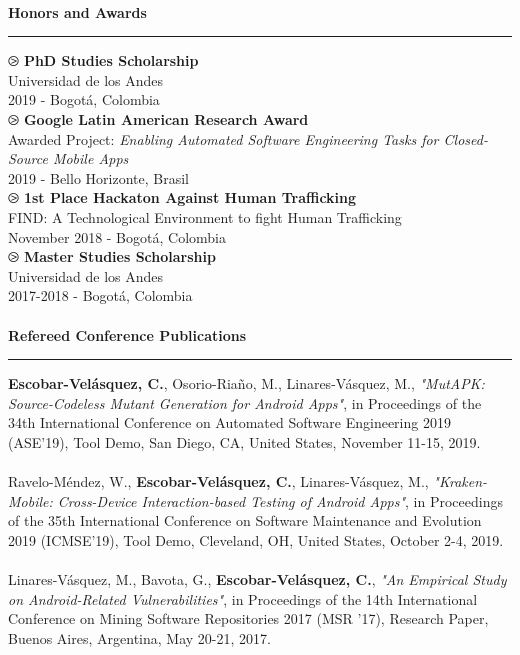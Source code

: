 \documentclass[letterpaper,11pt,oneside]{article}
\begin{document}
\\
\noindent \Large{\textbf{Honors and Awards}} \\
\vspace{-2ex}
\hrule 
\normalsize
\vspace{2ex}
\noindent $\ogreaterthan$ \textbf{PhD Studies Scholarship} \\
Universidad de los Andes\\
2019 - Bogotá, Colombia \\
\noindent $\ogreaterthan$ \textbf{Google Latin American Research Award} \\
Awarded Project: \textit{Enabling Automated Software Engineering Tasks for Closed-Source Mobile Apps}\\
2019 - Bello Horizonte, Brasil \\
\noindent $\ogreaterthan$ \textbf{1st Place Hackaton Against Human Trafficking} \\
FIND: A Technological Environment to fight Human Trafficking\\
November 2018 - Bogotá, Colombia \\
\noindent $\ogreaterthan$ \textbf{Master Studies Scholarship} \\
Universidad de los Andes\\
2017-2018 - Bogotá, Colombia \\
\\
\noindent \Large{\textbf{Refereed Conference Publications}} \\
\vspace{-2ex}
\hrule 
\normalsize
\vspace{2ex}
\noindent [c3] \textbf{Escobar-Velásquez, C.}, Osorio-Riaño, M., Linares-Vásquez, M., \textit{"MutAPK: Source-Codeless Mutant Generation for Android Apps"}, in Proceedings of the 34th International Conference on Automated Software Engineering 2019 (ASE’19), Tool Demo, San Diego, CA, United States, November 11-15, 2019. \\
\\
\noindent [c2] Ravelo-Méndez, W., \textbf{Escobar-Velásquez, C.}, Linares-Vásquez, M., \textit{"Kraken-Mobile: Cross-Device Interaction-based Testing of Android Apps"}, in Proceedings of the 35th International Conference on Software Maintenance and Evolution 2019 (ICMSE’19), Tool Demo, Cleveland, OH, United States, October 2-4, 2019. \\
\\
\noindent [c1] Linares-Vásquez, M., Bavota, G., \textbf{Escobar-Velásquez, C.}, \textit{"An Empirical Study on Android-Related Vulnerabilities"}, in Proceedings of the 14th International Conference on Mining Software Repositories 2017 (MSR ’17), Research Paper, Buenos Aires, Argentina, May 20-21, 2017. \\
\\
\end{document}

